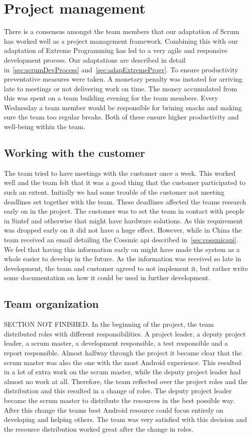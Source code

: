 \section{Project management}
There is a consensus amongst the team members that our adaptation of Scrum has worked well as a project management framework. Combining this with our adaptation of Extreme Programming has led to a very agile and responsive development process. Our adaptations are described in detail in~\ref{sec:scrumDevProcess} and~\ref{sec:adapExtremeProgr}. To ensure productivity preventative measures were taken. A monetary penalty was instated for arriving late to meetings or not delivering work on time. The money accumulated from this was spent on a team building evening for the team members. Every Wednesday a team member would be responsible for brining snacks and making sure the team too regular breaks. Both of these ensure higher productivity and well-being within the team.

\subsection{Working with the customer}
The team tried to have meetings with the customer once a week. This worked well and the team felt that it was a good thing that the customer participated to such an extent. Initially we had some trouble of the customer not meeting deadlines set together with the team. These deadlines affected the teams research early on in the project. The customer was to set the team in contact with people in Sintef and otherwise that might have hardware solutions. As this requirement was dropped early on it did not have a huge effect. However, while in China the team received an email detailing the Cossmic api described in~\ref{sec:cossmicapi}. We feel that having this information early on might have made the system as a whole easier to develop in the future. As the information was received so late in development, the team and customer agreed to not implement it, but rather write some documentation on how it could be used in further development.

\subsection{Team organization}
SECTION NOT FINISHED.
In the beginning of the project, the team distributed roles with different responsibilities. A project leader, a deputy project leader, a scrum master, a development responsible, a test responsible and a report responsible. Almost halfway through the project it became clear that the scrum master was also the one with the most Android experience. This resulted in a lot of extra work on the scrum master, while the deputy project leader had almost no work at all. Therefore, the team reflected over the project roles and the distribution and this resulted in a change of roles. The deputy project leader became the scrum master to distribute the resources in the best possible way. After this change the teams best Android resource could focus entirely on developing and helping others. The team was very satisfied with this decision and the resource distribution worked great after the change in roles. 

